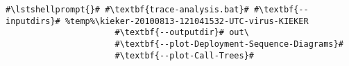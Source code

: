 \begin{lstlisting}[caption=Commands to produce the diagrams under Windows,label=lst:traceAnalysis:sequenceDiagramWin]
#\lstshellprompt{}# #\textbf{trace-analysis.bat}# #\textbf{--inputdirs}# %temp%\kieker-20100813-121041532-UTC-virus-KIEKER
                      #\textbf{--outputdir}# out\
                      #\textbf{--plot-Deployment-Sequence-Diagrams}#
                      #\textbf{--plot-Call-Trees}#		
\end{lstlisting}
